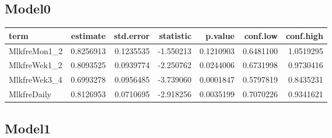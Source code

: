 \documentclass[]{article}
\newenvironment{Shaded}{\begin{snugshade}}{\end{snugshade}}
\newcommand{\DataTypeTok}[1]{\textcolor[rgb]{0.13,0.29,0.53}{#1}}
\newcommand{\KeywordTok}[1]{\textcolor[rgb]{0.13,0.29,0.53}{\textbf{#1}}}
\newcommand{\NormalTok}[1]{#1}
\newcommand{\OperatorTok}[1]{\textcolor[rgb]{0.81,0.36,0.00}{\textbf{#1}}}
\newcommand{\OtherTok}[1]{\textcolor[rgb]{0.56,0.35,0.01}{#1}}
\newcommand{\StringTok}[1]{\textcolor[rgb]{0.31,0.60,0.02}{#1}}
\begin{document}
\hypertarget{model0-1}{%
\subsection{Model0}\label{model0-1}}

\begin{Shaded}
\end{Shaded}

\begin{longtable}[]{@{}lrrrrrr@{}}
\toprule
term & estimate & std.error & statistic & p.value & conf.low &
conf.high\tabularnewline
\midrule
\endhead
MlkfreMon1\_2 & 0.8256913 & 0.1235535 & -1.550213 & 0.1210903 &
0.6481100 & 1.0519295\tabularnewline
MlkfreWek1\_2 & 0.8093525 & 0.0939774 & -2.250762 & 0.0244006 &
0.6731998 & 0.9730416\tabularnewline
MlkfreWek3\_4 & 0.6993278 & 0.0956485 & -3.739060 & 0.0001847 &
0.5797819 & 0.8435231\tabularnewline
MlkfreDaily & 0.8126953 & 0.0710695 & -2.918256 & 0.0035199 & 0.7070226
& 0.9341621\tabularnewline
\bottomrule
\end{longtable}

\hypertarget{model1-1}{%
\subsection{Model1}\label{model1-1}}

\begin{Shaded}
\end{Shaded}
\end{document}
